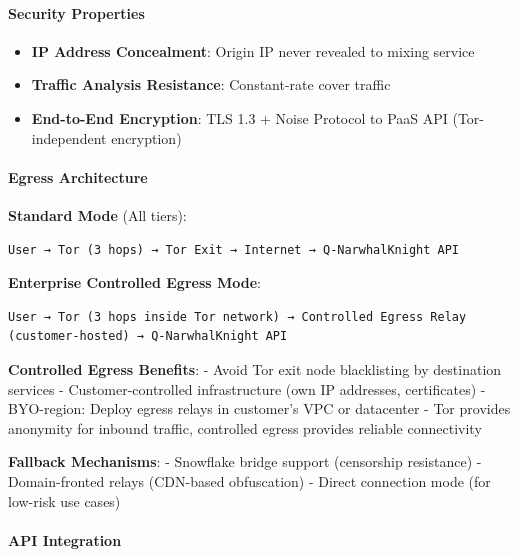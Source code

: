 \documentclass[
  11pt,
]{article}
\providecommand{\tightlist}{%
  \setlength{\itemsep}{0pt}\setlength{\parskip}{0pt}}
\begin{document}
\hypertarget{security-properties}{%
\paragraph{Security Properties}\label{security-properties}}

\begin{itemize}
\tightlist
\item
  \textbf{IP Address Concealment}: Origin IP never revealed to mixing
  service
\item
  \textbf{Traffic Analysis Resistance}: Constant-rate cover traffic
\item
  \textbf{End-to-End Encryption}: TLS 1.3 + Noise Protocol to PaaS API
  (Tor-independent encryption)
\end{itemize}

\hypertarget{egress-architecture}{%
\paragraph{Egress Architecture}\label{egress-architecture}}

\textbf{Standard Mode} (All tiers):

\begin{verbatim}
User → Tor (3 hops) → Tor Exit → Internet → Q-NarwhalKnight API
\end{verbatim}

\textbf{Enterprise Controlled Egress Mode}:

\begin{verbatim}
User → Tor (3 hops inside Tor network) → Controlled Egress Relay (customer-hosted) → Q-NarwhalKnight API
\end{verbatim}

\textbf{Controlled Egress Benefits}: - Avoid Tor exit node blacklisting
by destination services - Customer-controlled infrastructure (own IP
addresses, certificates) - BYO-region: Deploy egress relays in
customer's VPC or datacenter - Tor provides anonymity for inbound
traffic, controlled egress provides reliable connectivity

\textbf{Fallback Mechanisms}: - Snowflake bridge support (censorship
resistance) - Domain-fronted relays (CDN-based obfuscation) - Direct
connection mode (for low-risk use cases)

\hypertarget{api-integration}{%
\paragraph{API Integration}\label{api-integration}}
\end{document}
